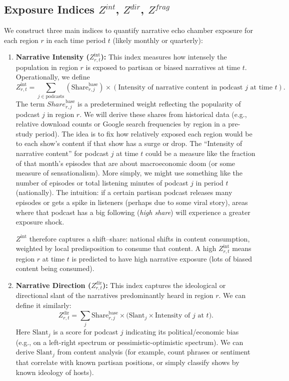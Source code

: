\documentclass[12pt]{article}
\begin{document}
\subsection{Exposure Indices \texorpdfstring{$Z^{int}$, $Z^{dir}$, $Z^{frag}$}{Zint, Zdir, Zfrag}}
We construct three main indices to quantify narrative echo chamber exposure for each region $r$ in each time period $t$ (likely monthly or quarterly):
\begin{enumerate}
    \item \textbf{Narrative Intensity ($Z^{\text{int}}_{r,t}$):} This index measures how intensely the population in region $r$ is exposed to partisan or biased narratives at time $t$. Operationally, we define
          $$
              Z_{r,t}^\text{int} =\sum_{j \in \text{podcasts}}(\text{Share}_{r,j}^\text{base}  ) \times(\text{Intensity of narrative content in podcast } j \text{ at time } t).
          $$
          The term ${Share}_{r,j}^\text{base}$ is a predetermined weight reflecting the popularity of podcast $j$ in region $r$. We will derive these shares from historical data (e.g., relative download counts or Google search frequencies by region in a pre-study period). The idea is to fix how relatively exposed each region would be to each show's content if that show has a surge or drop.
          The ``Intensity of narrative content'' for podcast $j$ at time $t$ could be a measure like the fraction of that month's episodes that are about macroeconomic doom (or some measure of sensationalism). More simply, we might use something like the number of episodes or total listening minutes of podcast $j$ in period $t$ (nationally). The intuition: if a certain partisan podcast releases many episodes or gets a spike in listeners (perhaps due to some viral story), areas where that podcast has a big following (\textit{high share}) will experience a greater exposure shock.

          $Z^{\text{int}}$ therefore captures a shift--share: national shifts in content consumption, weighted by local predisposition to consume that content. A high $Z^{\text{int}}_{r,t}$ means region $r$ at time $t$ is predicted to have high narrative exposure (lots of biased content being consumed).

    \item \textbf{Narrative Direction ($Z^{\text{dir}}_{r,t}$):} This index captures the ideological or directional slant of the narratives predominantly heard in region $r$. We can define it similarly:
          \[
              Z^{\text{dir}}_{r,t} = \sum_{j} \text{Share}_{r,j}^{\text{base}} \times \Big( \text{Slant}_{j} \times \text{Intensity of $j$ at $t$} \Big).
          \]
          Here $\text{Slant}_{j}$ is a score for podcast $j$ indicating its political/economic bias (e.g., on a left-right spectrum or pessimistic-optimistic spectrum). We can derive $\text{Slant}_{j}$ from content analysis (for example, count phrases or sentiment that correlate with known partisan positions, or simply classify shows by known ideology of hosts).


\end{enumerate}
\end{document}
